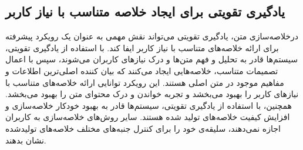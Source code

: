 \subsection{ یادگیری تقویتی برای ایجاد خلاصه متناسب با نیاز کاربر}
درخلاصه‌سازی متن، یادگیری تقویتی می‌تواند نقش مهمی به عنوان یک رویکرد پیشرفته برای ارائه خلاصه‌های متناسب با نیاز کاربر ایفا کند. با استفاده از یادگیری تقویتی، سیستم‌ها قادر به تحلیل و فهم متن‌ها و درک نیازهای کاربران می‌شوند، سپس با اعمال تصمیمات متناسب، خلاصه‌هایی ایجاد می‌کنند که بیان کننده اصلی‌ترین اطلاعات و مفاهیم موجود در متن اصلی هستند. این رویکرد توانایی ارائه خلاصه‌های متناسب با نیازهای کاربر را بهبود می‌بخشد و تجربه خواندن و درک محتوای متن را بهبود می‌بخشد. همچنین، با استفاده از یادگیری تقویتی، سیستم‌ها قادر به بهبود خودکار خلاصه‌سازی و افزایش کیفیت خلاصه‌های تولید شده هستند. %
سایر روش‌های خلاصه‌سازی به کاربران اجازه نمی‌دهند، سلیقه‌ی خود را برای کنترل جنبه‌های مختلف خلاصه‌های تولیدشده نشان بدهند. 

